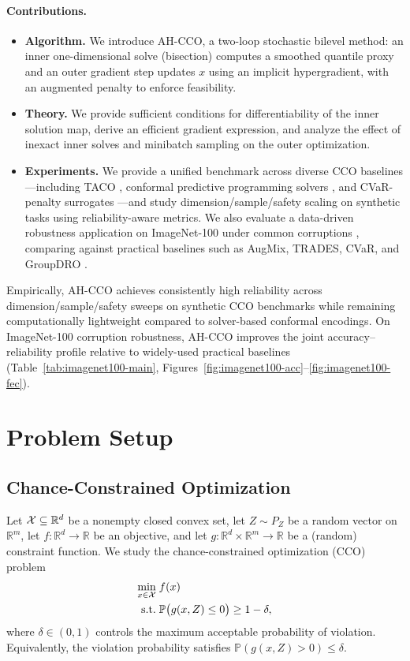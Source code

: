 \documentclass{uai2026} %
\theoremstyle{plain}
\theoremstyle{definition}
\begin{document}
\paragraph{Contributions.}
\begin{itemize}
  \item \textbf{Algorithm.} We introduce AH-CCO, a two-loop stochastic bilevel method: an inner one-dimensional solve (bisection) computes a smoothed quantile proxy and an outer gradient step updates $x$ using an implicit hypergradient, with an augmented penalty to enforce feasibility.
  \item \textbf{Theory.} We provide sufficient conditions for differentiability of the inner solution map, derive an efficient gradient expression, and analyze the effect of inexact inner solves and minibatch sampling on the outer optimization.
  \item \textbf{Experiments.} We provide a unified benchmark across diverse CCO baselines---including TACO \citep{laguelmalickackooij2021bilevel}, conformal predictive programming solvers \citep{zhao2024conformal}, and CVaR-penalty surrogates \citep{rockafellaruryasev2000cvar}---and study dimension/sample/safety scaling on synthetic tasks using reliability-aware metrics.
  We also evaluate a data-driven robustness application on ImageNet-100 under common corruptions \citep{deng2009imagenet,hendrycks2019benchmarking}, comparing against practical baselines such as AugMix, TRADES, CVaR, and GroupDRO \citep{hendrycks2020augmix,zhang2019theoretically,rockafellaruryasev2000cvar,sagawa2020distributionally}.
\end{itemize}

Empirically, AH-CCO achieves consistently high reliability across dimension/sample/safety sweeps on synthetic CCO benchmarks while remaining computationally lightweight compared to solver-based conformal encodings.
On ImageNet-100 corruption robustness, AH-CCO improves the joint accuracy--reliability profile relative to widely-used practical baselines (Table~\ref{tab:imagenet100-main}, Figures~\ref{fig:imagenet100-acc}--\ref{fig:imagenet100-fec}).

\section{Problem Setup}\label{sec:setup}
\subsection{Chance-Constrained Optimization}
Let $\mathcal{X}\subseteq \mathbb{R}^d$ be a nonempty closed convex set, let $Z\sim P_Z$ be a random vector on $\mathbb{R}^m$, let $f:\mathbb{R}^d\to\mathbb{R}$ be an objective, and let $g:\mathbb{R}^d\times\mathbb{R}^m\to\mathbb{R}$ be a (random) constraint function.
We study the chance-constrained optimization (CCO) problem
\begin{align}
  \min_{x\in \mathcal{X}}\; & f(x)\label{eq:cco}\\
  \text{s.t.}\; & \mathbb{P}\big(g(x,Z)\le 0\big)\ge 1-\delta,\nonumber
\end{align}
where $\delta\in(0,1)$ controls the maximum acceptable probability of violation.
Equivalently, the violation probability satisfies $\mathbb{P}(g(x,Z)>0)\le \delta$.
\end{document}

